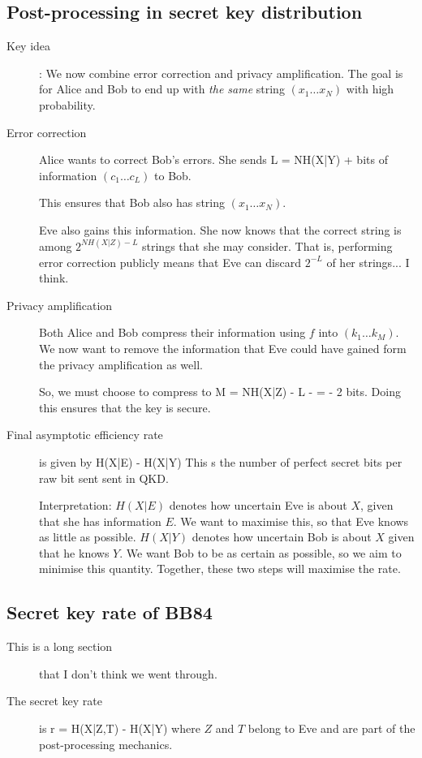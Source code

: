\subsection{Post-processing in secret key distribution}
\begin{description}
\item[Key idea]: We now combine error correction and privacy amplification. The goal is for Alice and Bob to end up with \emph{the same} string $(x_1\ldots x_N)$ with high probability. 

\item[Error correction] Alice wants to correct Bob's errors. She sends
\beq
L = NH(X|Y) + 
\eeq
bits of information $(c_1 \ldots c_L)$ to Bob. 

This ensures that Bob also has string $(x_1 \ldots x_N)$. 

Eve also gains this information. She now knows that the correct string is among $2^{NH(X|Z) - L}$ strings that she may consider. That is, performing error correction publicly means that Eve can discard $2^{-L}$ of her strings... I think. 


\item[Privacy amplification] Both Alice and Bob compress their information using $f$ into $(k_1 \ldots k_M)$. We now want to remove the information that Eve could have gained form the privacy amplification as well. 

So, we must choose to compress to 
\beq
M = NH(X|Z) - L -  = - 2 
\eeq
bits. Doing this ensures that the key is secure.

\item[Final asymptotic efficiency rate] is given by 
\beq
H(X|E) - H(X|Y)
\eeq
This s the number of perfect secret bits per raw bit sent sent in QKD. 

Interpretation: $H(X|E)$ denotes how uncertain Eve is about $X$, given that she has information $E$. We want to maximise this, so that Eve knows as little as possible. $H(X|Y)$ denotes how uncertain Bob is about $X$ given that he knows $Y$. We want Bob to be as certain as possible, so we aim to minimise this quantity. Together, these two steps will maximise the rate. 
\end{description}

\subsection{Secret key rate of BB84}
\begin{description}

\item[This is a long section] that I don't think we went through. 


\item[The secret key rate] is
\beq
r = H(X|Z,T) - H(X|Y)
\eeq
where $Z$ and $T$ belong to Eve and are part of the post-processing mechanics. 


\end{description}

